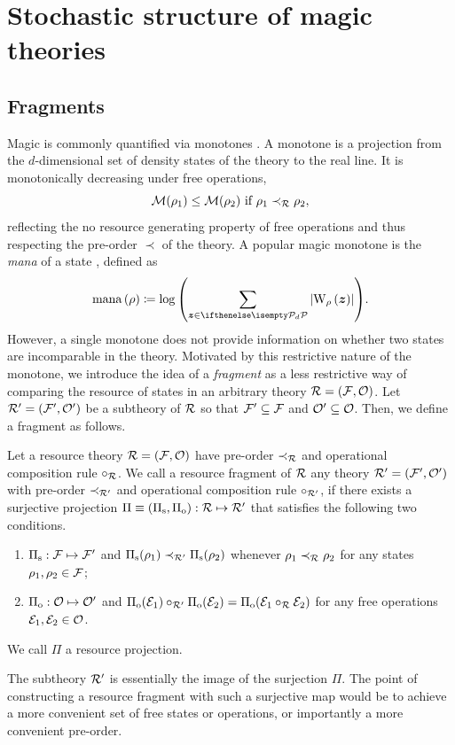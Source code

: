 \section{Stochastic structure of magic theories}
\label{sec:struc}

\subsection{Fragments}\label{sec:frag}

Magic is commonly quantified via monotones . 
A monotone is a projection from the $d$-dimensional set of density states of the theory to the real line. 
It is monotonically decreasing under free operations, 
\begin{equation}\label{eq:monotonicity}
    \mathcal{M}(\rho_1) \leq \mathcal{M}(\rho_2)\ \text{if}\ \rho_1 \prec_{\mathcal{R}} \rho_2,
\end{equation}
reflecting the no resource generating property of free operations and thus respecting the pre-order $\prec$ of the theory.
A popular magic monotone is the \emph{mana} of a state , defined as
\begin{equation}
    \mana{\rho} \coloneqq \log{\left(\sum\limits_{\bmz \in \pd} \abs{\W[\bmz]{\rho}}\right)}.
\end{equation}
However, a single monotone does not provide information on whether two states are incomparable in the theory.
Motivated by this restrictive nature of the monotone, we introduce the idea of a \emph{fragment} as a less restrictive way of comparing the resource of states in an arbitrary theory $\mathcal{R} = (\mathcal{F}, \mathcal{O})$. 
Let $\mathcal{R}' = (\mathcal{F}', \mathcal{O}')$ be a subtheory of $\mathcal{R}$ so that $\mathcal{F}' \subseteq \mathcal{F}$ and $\mathcal{O}' \subseteq \mathcal{O}$. 
Then, we define a fragment as follows.
\begin{definition}\label{def:fragment}
    Let a resource theory $\mathcal{R} = (\mathcal{F}, \mathcal{O})$ have pre-order $\prec_{\mathcal{R}}$ and operational composition rule $\circ_{\mathcal{R}}$. 
    We call a resource fragment of $\mathcal{R}$ any theory $\mathcal{R}' = (\mathcal{F}', \mathcal{O}')$ with pre-order $\prec_{\mathcal{R}'}$ and operational composition rule $\circ_{\mathcal{R}'}$, if there exists a surjective projection $\Pi \equiv (\Pi_{\rm{s}}, \Pi_{\rm{o}}): \mathcal{R} \mapsto \mathcal{R}'$ that satisfies the following two conditions.
    \begin{enumerate}
        \item $\Pi_{\rm{s}}: \mathcal{F} \mapsto \mathcal{F}'$ and $\Pi_{\rm{s}}(\rho_1) \prec_{\mathcal{R}'} \Pi_{\rm{s}}(\rho_2)$ whenever $\rho_1 \prec_{\mathcal{R}} \rho_2$ for any states $\rho_1, \rho_2 \in \mathcal{F}$;
        \item $\Pi_{\rm{o}}: \mathcal{O} \mapsto \mathcal{O}'$ and $\Pi_{\rm{o}}(\mathcal{E}_1) \circ_{\mathcal{R}'} \Pi_{\rm{o}}(\mathcal{E}_2) = \Pi_{\rm{o}}(\mathcal{E}_1 \circ_{\mathcal{R}} \mathcal{E}_2)$ for any free operations $\mathcal{E}_1, \mathcal{E}_2 \in \mathcal{O}$. 
    \end{enumerate}
    We call $\Pi$ a resource projection.
\end{definition}
The subtheory $\mathcal{R}'$ is essentially the image of the surjection $\Pi$.
The point of constructing a resource fragment with such a surjective map would be to achieve a more convenient set of free states or operations, or importantly a more convenient pre-order.

